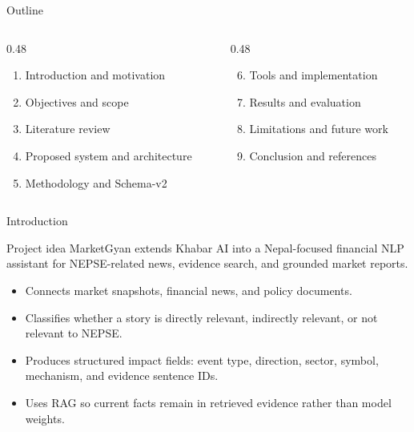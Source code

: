 \documentclass[aspectratio=169,11pt]{beamer}
\begin{document}
\begin{frame}{Outline}
  \begin{columns}[T,onlytextwidth]
    \begin{column}{0.48\textwidth}
      \begin{enumerate}
        \item Introduction and motivation
        \item Objectives and scope
        \item Literature review
        \item Proposed system and architecture
        \item Methodology and Schema-v2
      \end{enumerate}
    \end{column}
    \begin{column}{0.48\textwidth}
      \begin{enumerate}
        \setcounter{enumi}{5}
        \item Tools and implementation
        \item Results and evaluation
        \item Limitations and future work
        \item Conclusion and references
      \end{enumerate}
    \end{column}
  \end{columns}
\end{frame}

\begin{frame}{Introduction}
  \begin{block}{Project idea}
    MarketGyan extends Khabar AI into a Nepal-focused financial NLP assistant for NEPSE-related news, evidence search, and grounded market reports.
  \end{block}

  \begin{itemize}
    \item Connects market snapshots, financial news, and policy documents.
    \item Classifies whether a story is directly relevant, indirectly relevant, or not relevant to NEPSE.
    \item Produces structured impact fields: event type, direction, sector, symbol, mechanism, and evidence sentence IDs.
    \item Uses RAG so current facts remain in retrieved evidence rather than model weights.
  \end{itemize}
\end{frame}
\end{document}

